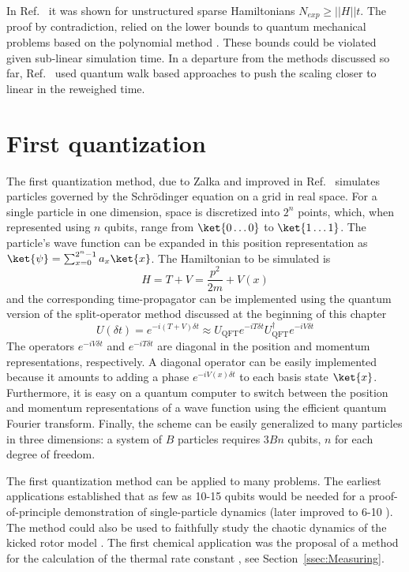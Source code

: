 \documentclass[11pt,oneside,final]{huthesis}%
\begin{document}
In Ref.~\cite{Berry07} it was shown for unstructured sparse Hamiltonians $N_{exp}\geq ||H||t$.  The proof by contradiction, relied on the lower bounds to quantum mechanical problems based on the polynomial method \cite{Beals98}.  These bounds could be violated given sub-linear simulation time.  In a departure from the methods discussed so far, Ref.~\cite{Childs09} used quantum walk based approaches to push the scaling closer to linear in the reweighed time.




\section{First quantization}
\label{ssec:First}

The first quantization method, due to Zalka
\cite{Zalka98,Wiesner96} and improved in Ref.~\cite{Kassal08}
simulates particles governed by the
Schr\"odinger equation on a grid in real space. For a single particle in one dimension, space is discretized
into $2^n$ points, which, when represented using $n$ qubits, range from
$\ket{0\ldots 0}$ to $\ket{1\ldots 1}$. The particle's wave function can be
expanded in this position representation as $\ket{\psi}=\sum_{x=0}^{2^n-1} a_x
\ket{x}$. The Hamiltonian to be simulated is
\begin{equation}
H=T+V=\frac{p^2}{2m}+V(x)
\end{equation}
and the corresponding  time-propagator can be implemented using the quantum version of the
split-operator method discussed at the beginning of this chapter
\begin{equation}
U(\delta t)=e^{-i(T+V)\delta t}\approx U_\mathrm{QFT} e^{-iT\delta t}
U^\dagger_\mathrm{QFT} e^{-iV\delta t}
\end{equation}
The operators $e^{-iV\delta t}$ and $e^{-iT\delta t}$ are diagonal in the
position and momentum representations, respectively. A diagonal operator can be
easily implemented because it amounts to adding a phase $e^{-i V(x) \delta t}$
to each basis state $\ket{x}$. Furthermore, it is easy on a quantum computer to
switch between the position and momentum representations of a wave function using
the efficient quantum Fourier transform. Finally, the scheme can be easily generalized to many
particles in three dimensions: a system of $B$ particles requires $3Bn$ qubits,
$n$ for each degree of freedom.

The first quantization method can be applied to many problems. The earliest
applications established that as few as 10-15 qubits would be needed for a
proof-of-principle demonstration of single-particle dynamics
\cite{Strini02} (later improved to 6-10 \cite{Benenti08}).  The method
could also be used to faithfully study the chaotic dynamics of the kicked rotor
model \cite{Levi03}. The first chemical application was the proposal of a
method for the calculation of the thermal rate constant \cite{Lidar99}, see
Section~\ref{ssec:Measuring}.
\end{document}
